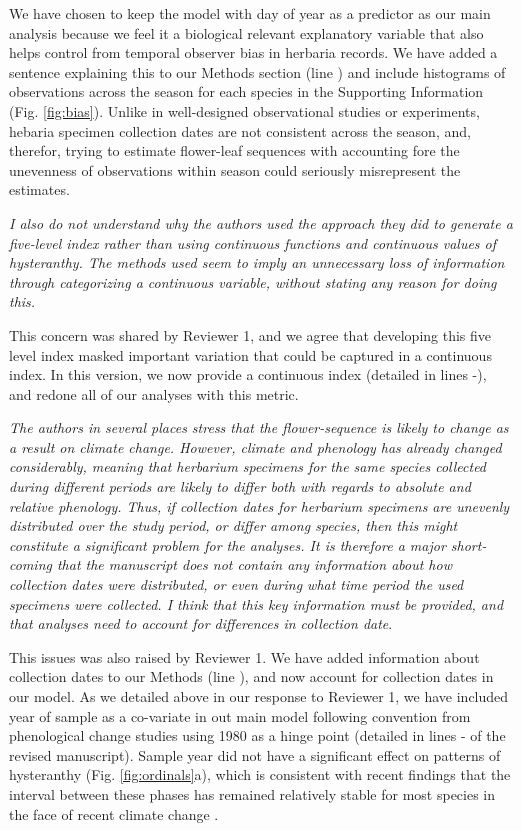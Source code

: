 \documentclass{article}[12pt]
\begin{document}
We have chosen to keep the model with day of year as a predictor as our main analysis because we feel it a biological relevant explanatory variable that also helps control from temporal observer bias in herbaria records. We have added a sentence explaining this to our Methods section (line ) and include histograms of observations across the season for each species in the Supporting Information (Fig. \ref{fig:bias}). Unlike in well-designed observational studies or experiments, hebaria specimen collection dates are not consistent across the season, and, therefor, trying to estimate flower-leaf sequences with accounting fore the unevenness of observations within season could seriously misrepresent the estimates. 

\emph{I also do not understand why the authors used the approach they did to generate a five-level index rather than using continuous functions and continuous values of hysteranthy. The methods used seem to imply an unnecessary loss of information through categorizing a continuous variable, without stating any reason for doing this.}

This concern was shared by Reviewer 1, and we agree that developing this five level index masked important variation that could be captured in a continuous index. In this version, we now provide a continuous index (detailed in lines -), and redone all of our analyses with this metric.

\emph{The authors in several places stress that the flower-sequence is likely to change as a result on climate change. However, climate and phenology has already changed considerably, meaning that herbarium specimens for the same species collected during different periods are likely to differ both with regards to absolute and relative phenology. Thus, if collection dates for herbarium specimens are unevenly distributed over the study period, or differ among species, then this might constitute a significant problem for the analyses. It is therefore a major short-coming that the manuscript does not contain any information about how collection dates were distributed, or even during what time period the used specimens were collected. I think that this key information must be provided, and that analyses need to account for differences in collection date}.

This issues was also raised by Reviewer 1. We have added information about collection dates to our Methods (line ), and now account for collection dates in our model. As we detailed above in our response to  Reviewer 1, we have included year of sample as a co-variate in out main model following convention from phenological change studies using 1980 as a hinge point (detailed in lines - of the revised manuscript). Sample year did not have a significant effect on patterns of hysteranthy (Fig. \ref{fig:ordinals}a), which is consistent with recent findings that the interval between these phases has remained relatively stable for most species in the face of recent climate change \citep{Guo:2023wb}. 
\end{document}
